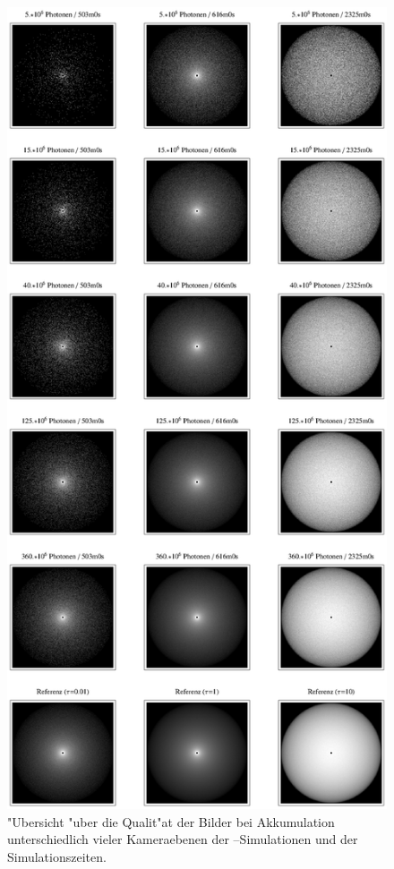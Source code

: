 		\begin{figure}
			\centering
			\includegraphics[height=1.0\textheight]{mc3dsphereimageoverview.eps}
			\caption{"Ubersicht "uber die Qualit"at der Bilder bei Akkumulation unterschiedlich vieler Kameraebenen der \mctd--Simulationen und der Simulationszeiten.}
			\label{fig:mc3d_sphere_imageoverview}
		\end{figure}
